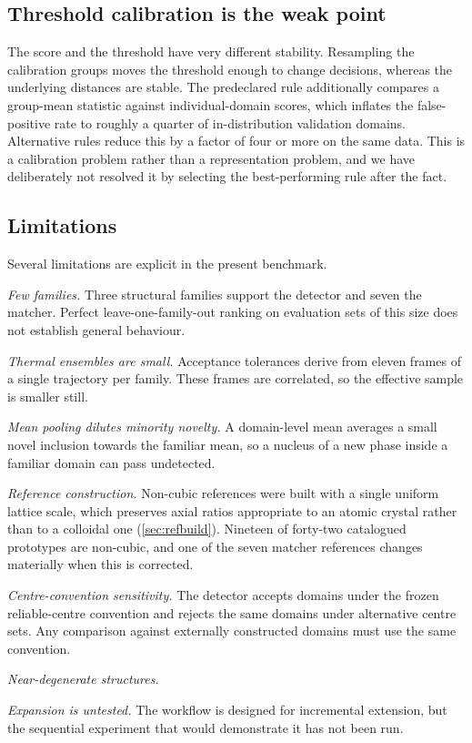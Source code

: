 \subsection{Threshold calibration is the weak point}

The score and the threshold have very different stability. Resampling the calibration groups
moves the threshold enough to change decisions, whereas the underlying distances are stable.
The predeclared rule additionally compares a group-mean statistic against individual-domain
scores, which inflates the false-positive rate to roughly a quarter of in-distribution
validation domains. Alternative rules reduce this by a factor of four or more on the same
data. This is a calibration problem rather than a representation problem, and we have
deliberately not resolved it by selecting the best-performing rule after the fact.

\subsection{Limitations}

Several limitations are explicit in the present benchmark.

\emph{Few families.} Three structural families support the detector and seven the matcher.
Perfect leave-one-family-out ranking on evaluation sets of this size does not establish
general behaviour.

\emph{Thermal ensembles are small.} Acceptance tolerances derive from eleven frames of a
single trajectory per family. These frames are correlated, so the effective sample is
smaller still.

\emph{Mean pooling dilutes minority novelty.} A domain-level mean averages a small novel
inclusion towards the familiar mean, so a nucleus of a new phase inside a familiar domain can
pass undetected.

\emph{Reference construction.} Non-cubic references were built with a single uniform lattice
scale, which preserves axial ratios appropriate to an atomic crystal rather than to a
colloidal one (\cref{sec:refbuild}). Nineteen of forty-two catalogued prototypes are
non-cubic, and one of the seven matcher references changes materially when this is corrected.

\emph{Centre-convention sensitivity.} The detector accepts domains under the frozen
reliable-centre convention and rejects the same domains under alternative centre sets. Any
comparison against externally constructed domains must use the same convention.

\emph{Near-degenerate structures.} 

\emph{Expansion is untested.} The workflow is designed for incremental extension, but the
sequential experiment that would demonstrate it has not been run.
